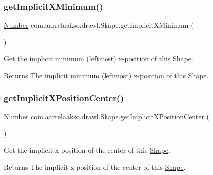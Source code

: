 \subsubsection{\texorpdfstring{get\+Implicit\+X\+Minimum()}{getImplicitXMinimum()}}
{\footnotesize\ttfamily \hyperlink{interfacecom_1_1aarrelaakso_1_1drawl_1_1_number}{Number} com.\+aarrelaakso.\+drawl.\+Shape.\+get\+Implicit\+X\+Minimum (\begin{DoxyParamCaption}{ }\end{DoxyParamCaption})\hspace{0.3cm}{\ttfamily [protected]}}



Get the implicit minimum (leftmost) x-\/position of this \hyperlink{classcom_1_1aarrelaakso_1_1drawl_1_1_shape}{Shape}. 

\begin{DoxyReturn}{Returns}
The implicit minimum (leftmost) x-\/position of this \hyperlink{classcom_1_1aarrelaakso_1_1drawl_1_1_shape}{Shape}. 
\end{DoxyReturn}
\mbox{\label{classcom_1_1aarrelaakso_1_1drawl_1_1_shape_a9632097be62eb03e09145763852bda85}} 
\subsubsection{\texorpdfstring{get\+Implicit\+X\+Position\+Center()}{getImplicitXPositionCenter()}}
{\footnotesize\ttfamily \hyperlink{interfacecom_1_1aarrelaakso_1_1drawl_1_1_number}{Number} com.\+aarrelaakso.\+drawl.\+Shape.\+get\+Implicit\+X\+Position\+Center (\begin{DoxyParamCaption}{ }\end{DoxyParamCaption})\hspace{0.3cm}{\ttfamily [protected]}}



Get the implicit x position of the center of this \hyperlink{classcom_1_1aarrelaakso_1_1drawl_1_1_shape}{Shape}. 

\begin{DoxyReturn}{Returns}
The implicit x position of the center of this \hyperlink{classcom_1_1aarrelaakso_1_1drawl_1_1_shape}{Shape}. 
\end{DoxyReturn}
\mbox{\label{classcom_1_1aarrelaakso_1_1drawl_1_1_shape_a2f272e8bfa625bb7959d1f722d5ac3df}} 
